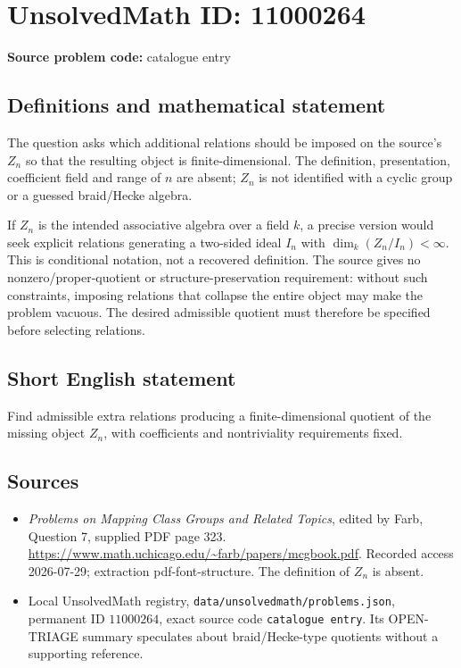 \documentclass[11pt]{article}
\begin{document}
\section*{UnsolvedMath ID: 11000264}
\textbf{Source problem code:} catalogue entry
\subsection{Definitions and mathematical statement}
The question asks which additional relations should be imposed on the source's \(Z_n\) so that the resulting object is finite-dimensional. The definition, presentation, coefficient field and range of \(n\) are absent; \(Z_n\) is not identified with a cyclic group or a guessed braid/Hecke algebra.

If \(Z_n\) is the intended associative algebra over a field \(k\), a precise version would seek explicit relations generating a two-sided ideal \(I_n\) with \(\dim_k(Z_n/I_n)<\infty\). This is conditional notation, not a recovered definition. The source gives no nonzero/proper-quotient or structure-preservation requirement: without such constraints, imposing relations that collapse the entire object may make the problem vacuous. The desired admissible quotient must therefore be specified before selecting relations.
\subsection{Short English statement}
Find admissible extra relations producing a finite-dimensional quotient of the missing object \(Z_n\), with coefficients and nontriviality requirements fixed.
\subsection{Sources}
\begin{itemize}
\item \emph{Problems on Mapping Class Groups and Related Topics}, edited by Farb, Question 7, supplied PDF page 323. \url{https://www.math.uchicago.edu/~farb/papers/mcgbook.pdf}. Recorded access 2026-07-29; extraction pdf-font-structure. The definition of \(Z_n\) is absent.
\item Local UnsolvedMath registry, \texttt{data/unsolvedmath/problems.json}, permanent ID \(11000264\), exact source code \texttt{catalogue entry}. Its OPEN-TRIAGE summary speculates about braid/Hecke-type quotients without a supporting reference.
\end{itemize}
\end{document}
